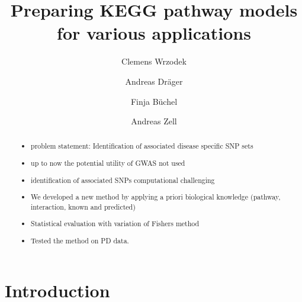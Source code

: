 \documentclass[citeauthoryear]{llncs}
\begin{document}
\title{Preparing KEGG pathway models for various applications}

\author{Clemens Wrzodek \and Andreas Dr\"ager \and Finja B\"uchel \and Andreas Zell}


\maketitle


\begin{abstract}
%
%
%
%
\begin{itemize}
\item problem statement: Identification of associated disease specific SNP sets\\
\item up to now the potential utility of GWAS not used\\
\item identification of associated SNPs computational challenging\\
\item We developed a new method by applying a priori biological knowledge (pathway, interaction, known and predicted)\\
\item Statistical evaluation with variation of Fishers method\\
\item Tested the method on PD data.
\end{itemize}

\end{abstract}

\section{Introduction}
%
%
\end{document}
